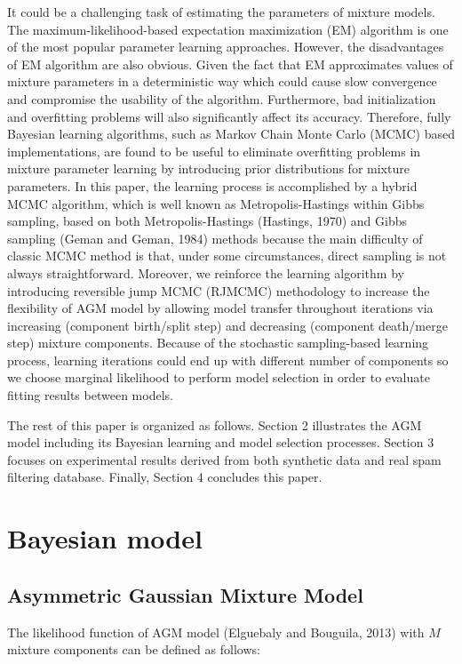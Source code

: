 \documentclass[conference]{IEEEtran}
\begin{document}
It could be a challenging task of estimating the parameters of mixture models. The maximum-likelihood-based expectation maximization (EM) \cite{b3} algorithm is one of the most popular parameter learning approaches. However, the disadvantages of EM algorithm are also obvious. Given the fact that EM approximates values of mixture parameters in a deterministic way which could cause slow convergence and compromise the usability of the algorithm. Furthermore, bad initialization and overfitting problems\cite{b4} \cite{b5} will also significantly affect its accuracy. Therefore, fully Bayesian learning algorithms, such as Markov Chain Monte Carlo (MCMC) based implementations, are found to be useful to eliminate overfitting problems in mixture parameter learning by introducing prior distributions for mixture parameters. In this paper, the learning process is accomplished by a hybrid MCMC algorithm, which is well known as Metropolis-Hastings within Gibbs sampling\cite{b4}, based on both Metropolis-Hastings (Hastings, 1970)\cite{b6} and Gibbs sampling (Geman and Geman, 1984)\cite{b7} methods because the main difficulty of classic MCMC method is that, under some circumstances, direct sampling is not always straightforward. Moreover, we reinforce the learning algorithm by introducing reversible jump MCMC (RJMCMC)\cite{b5} methodology to increase the flexibility of AGM model by allowing model transfer throughout iterations via increasing (component birth/split step) and decreasing (component death/merge step) mixture components. Because of the stochastic sampling-based learning process, learning iterations could end up with different number of components so we choose marginal likelihood\cite{b4} to perform model selection in order to evaluate fitting results between models.

The rest of this paper is organized as follows. Section 2 illustrates the AGM model including its Bayesian learning and model selection processes. Section 3 focuses on experimental results derived from both synthetic data and real spam filtering database. Finally, Section 4 concludes this paper.


\section{Bayesian model}
\subsection{Asymmetric Gaussian Mixture Model}
The likelihood function of AGM model (Elguebaly and Bouguila, 2013)\cite{b2} with $M$ mixture components can be defined as follows:
\end{document}
